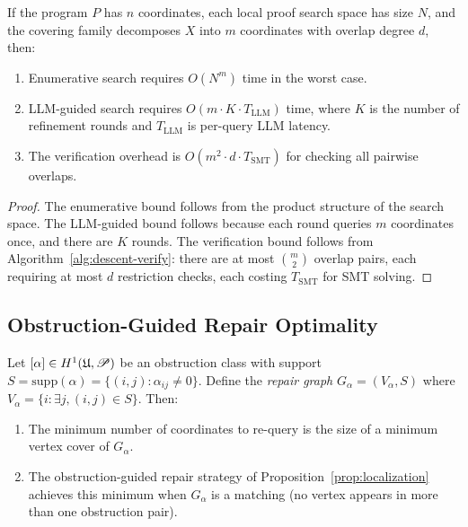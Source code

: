 \documentclass[11pt]{article}
\newcommand{\ProofSheaf}{\mathscr{P}}
\begin{document}
\begin{corollary}\label{cor:speedup}
If the program $P$ has $n$ coordinates, each local proof search space
has size $N$, and the covering family decomposes $X$ into $m$
coordinates with overlap degree $d$, then:
\begin{enumerate}[label=(\roman*)]
  \item Enumerative search requires $O(N^m)$ time in the worst case.
  \item LLM-guided search requires $O(m \cdot K \cdot T_{\mathrm{LLM}})$
    time, where $K$ is the number of refinement rounds and
    $T_{\mathrm{LLM}}$ is per-query LLM latency.
  \item The verification overhead is $O(m^2 \cdot d \cdot T_{\mathrm{SMT}})$
    for checking all pairwise overlaps.
\end{enumerate}
\end{corollary}

\begin{proof}
The enumerative bound follows from the product structure of the search
space.  The LLM-guided bound follows because each round queries $m$
coordinates once, and there are $K$ rounds.  The verification bound
follows from Algorithm~\ref{alg:descent-verify}: there are at most
$\binom{m}{2}$ overlap pairs, each requiring at most $d$ restriction
checks, each costing $T_{\mathrm{SMT}}$ for SMT solving.
\end{proof}

\subsection{Obstruction-Guided Repair Optimality}\label{subsec:repair-opt}

\begin{theorem}\label{thm:minimal-repair}
Let $[\alpha] \in \Hcoh{1}(\mathfrak{U}, \ProofSheaf)$ be an
obstruction class with support
$S = \mathrm{supp}(\alpha) = \{(i,j) : \alpha_{ij} \neq 0\}$.
Define the \emph{repair graph} $G_\alpha = (V_\alpha, S)$ where
$V_\alpha = \{i : \exists j, (i,j) \in S\}$.  Then:
\begin{enumerate}[label=(\roman*)]
  \item The minimum number of coordinates to re-query is the size of
    a minimum vertex cover of $G_\alpha$.
  \item The obstruction-guided repair strategy of
    Proposition~\ref{prop:localization} achieves this minimum when
    $G_\alpha$ is a matching (no vertex appears in more than one
    obstruction pair).
\end{enumerate}
\end{theorem}
\end{document}
